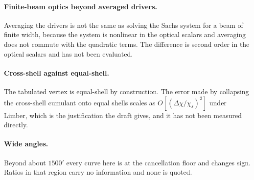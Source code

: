 \paragraph{Finite-beam optics beyond averaged drivers.} Averaging the
drivers is not the same as solving the Sachs system for a beam of finite
width, because the system is nonlinear in the optical scalars and averaging
does not commute with the quadratic terms. The difference is second order
in the optical scalars and has not been evaluated.

\paragraph{Cross-shell against equal-shell.} The tabulated vertex is
equal-shell by construction. The error made by collapsing the cross-shell
cumulant onto equal shells scales as $O[(\Delta\chi/\chi_s)^2]$ under
Limber, which is the justification the draft gives, and it has not been
measured directly.

\paragraph{Wide angles.} Beyond about $1500'$ every curve here is at the
cancellation floor and changes sign. Ratios in that region carry no
information and none is quoted.
